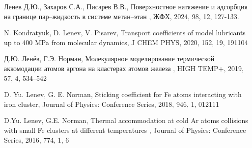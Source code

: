 Ленев Д.Ю., Захаров С.А., Писарев В.В., Поверхностное натяжение и адсорбция на границе пар–жидкость в системе метан–этан , ЖФХ, 2024, 98, 12, 127-133. 

     N. Kondratyuk, D. Lenev, V. Pisarev, Transport coefficients of model lubricants up to 400 MPa from molecular dynamics, J CHEM PHYS, 2020, 152, 19, 191104

Д.Ю. Ленёв, Г.Э. Норман, Молекулярное моделирование термической аккомодации атомов аргона на кластерах атомов железа , HIGH TEMP+, 2019, 57, 4, 534–542

D. Yu. Lenev, G. E. Norman, Sticking coefficient for Fe atoms interacting with iron cluster, Journal of Physics: Conference Series, 2018, 946, 1, 012111

D.Yu. Lenev, G.E. Norman, Thermal accommodation at cold Ar atoms collisions with small Fe clusters at different temperatures , Journal of Physics: Conference Series, 2016, 774, 1, 6